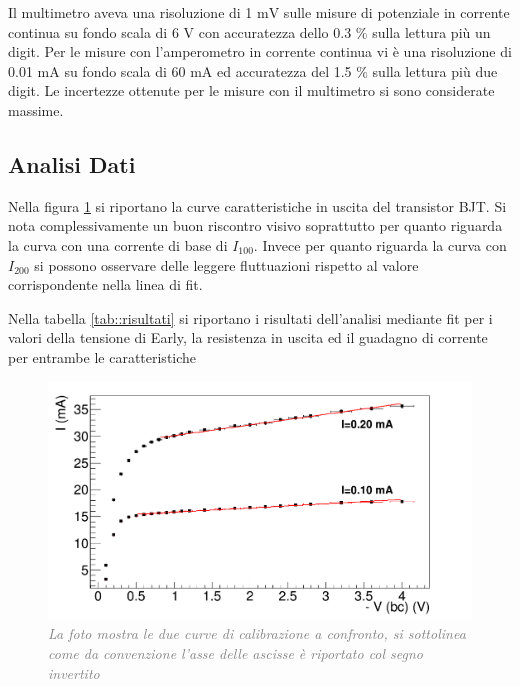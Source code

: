 \documentclass[a4paper,11pt]{article}
\begin{document}
Il multimetro aveva una risoluzione di 1 $\mathrm{mV}$ sulle misure di potenziale in corrente continua su fondo scala di 6 $\mathrm{V}$ con accuratezza dello 0.3 $\%$ sulla lettura più un digit. Per le misure con l'amperometro in corrente continua vi è una risoluzione di 0.01 $\mathrm{mA}$ su fondo scala di 60 $\mathrm{mA}$ ed accuratezza del 1.5 $\%$ sulla lettura più due digit. Le incertezze ottenute per le misure con il multimetro si sono considerate massime.

\subsection{Analisi Dati} 

Nella figura \ref{graph::curve} si riportano la curve caratteristiche in uscita del transistor BJT. Si nota complessivamente un buon riscontro visivo soprattutto per quanto riguarda la curva con una corrente di base di $I_{100}$. Invece per quanto riguarda la curva con $I_{200}$ si possono osservare delle leggere fluttuazioni rispetto al valore corrispondente nella linea di fit.

Nella tabella \ref{tab::risultati} si riportano i risultati dell'analisi mediante fit per i valori della tensione di Early, la resistenza in uscita ed il guadagno di corrente per entrambe le caratteristiche

\begin{figure}[ht]
\centering
    \includegraphics[width=0.7\linewidth]{pictures/g_tot_mean.png}
    \caption{\textit{\textcolor{gray}{La foto mostra le due curve di calibrazione a confronto, si sottolinea come da convenzione l'asse delle ascisse è riportato col segno invertito}}}
    \label{graph::curve} 
\end{figure}
\end{document}
